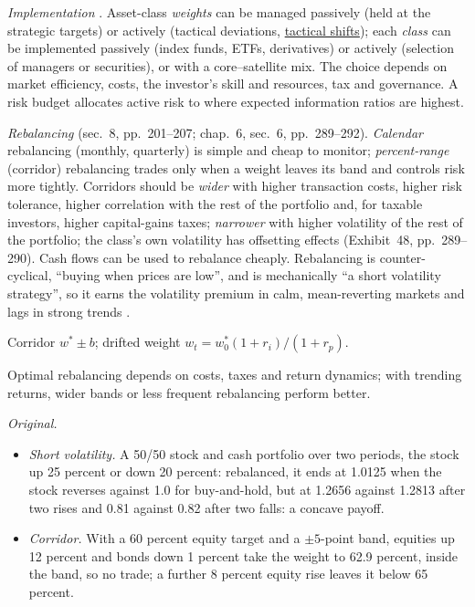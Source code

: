 \begin{qfmethod}\label{meth:allocation-implementation-rebalancing}
 \emph{Implementation} \citep[chap.~5, sec.~7, pp.~195--201]{portfolio-management-in-practice-v1-2020}. Asset-class \emph{weights} can be managed passively (held at the strategic targets) or actively (tactical deviations, \hyperref[meth:tactical-shifts-behavioural-biases]{tactical shifts}); each \emph{class} can be implemented passively (index funds, ETFs, derivatives) or actively (selection of managers or securities), or with a core--satellite mix. The choice depends on market efficiency, costs, the investor's skill and resources, tax and governance. A risk budget allocates active risk to where expected information ratios are highest.

\emph{Rebalancing} (sec.~8, pp.~201--207; chap.~6, sec.~6, pp.~289--292). \emph{Calendar} rebalancing (monthly, quarterly) is simple and cheap to monitor; \emph{percent-range} (corridor) rebalancing trades only when a weight leaves its band and controls risk more tightly. Corridors should be \emph{wider} with higher transaction costs, higher risk tolerance, higher correlation with the rest of the portfolio and, for taxable investors, higher capital-gains taxes; \emph{narrower} with higher volatility of the rest of the portfolio; the class's own volatility has offsetting effects (Exhibit~48, pp.~289--290). Cash flows can be used to rebalance cheaply. Rebalancing is counter-cyclical, ``buying when prices are low'', and is mechanically ``a short volatility strategy'', so it earns the volatility premium in calm, mean-reverting markets and lags in strong trends \citep[chap.~4, pp.~125--127 and~135--140]{s7-ang}.

 Corridor $w^*\pm b$; drifted weight $w_t=w^*_0(1+r_i)/(1+r_p)$.

 Optimal rebalancing depends on costs, taxes and return dynamics; with trending returns, wider bands or less frequent rebalancing perform better.

 \emph{Original.}
\begin{itemize}
\item \emph{Short volatility.} A 50/50 stock and cash portfolio over two periods, the stock up 25 percent or down 20 percent: rebalanced, it ends at 1.0125 when the stock reverses against 1.0 for buy-and-hold, but at 1.2656 against 1.2813 after two rises and 0.81 against 0.82 after two falls: a concave payoff.
\item \emph{Corridor.} With a 60 percent equity target and a $\pm5$-point band, equities up 12 percent and bonds down 1 percent take the weight to 62.9 percent, inside the band, so no trade; a further 8 percent equity rise leaves it below 65 percent.
\end{itemize}


\end{qfmethod}
